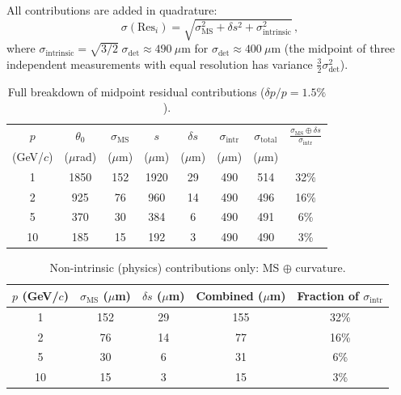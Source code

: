 \documentclass[11pt,a4paper]{article}
\begin{document}
All contributions are added in quadrature:
\begin{equation}
\sigma(\mathrm{Res}_i) = \sqrt{
\sigma_{\mathrm{MS}}^2 + \delta s^2 + \sigma_{\mathrm{intrinsic}}^2}\,,
\end{equation}
where $\sigma_{\mathrm{intrinsic}} = \sqrt{3/2}\;\sigma_{\mathrm{det}}
\approx 490~\mu$m for $\sigma_{\mathrm{det}} \approx 400~\mu$m
(the midpoint of three independent measurements with equal resolution
has variance $\tfrac{3}{2}\sigma_{\mathrm{det}}^2$).

\begin{table}[h]
\centering
\caption{Full breakdown of midpoint residual contributions
($\delta p/p = 1.5\%$).}
\label{tab:full}
\begin{tabular}{cccccccc}
\toprule
$p$ & $\theta_0$ & $\sigma_{\mathrm{MS}}$ & $s$ & $\delta s$ &
$\sigma_{\mathrm{intr}}$ & $\sigma_{\mathrm{total}}$ &
$\frac{\sigma_{\mathrm{MS}}\oplus\delta s}{\sigma_{\mathrm{intr}}}$ \\
(GeV/$c$) & ($\mu$rad) & ($\mu$m) & ($\mu$m) & ($\mu$m) &
($\mu$m) & ($\mu$m) & \\
\midrule
1  & 1850 & 152 & 1920 & 29 & 490 & 514 & 32\% \\
2  &  925 &  76 &  960 & 14 & 490 & 496 & 16\% \\
5  &  370 &  30 &  384 &  6 & 490 & 491 &  6\% \\
10 &  185 &  15 &  192 &  3 & 490 & 490 &  3\% \\
\bottomrule
\end{tabular}
\end{table}

\begin{table}[h]
\centering
\caption{Non-intrinsic (physics) contributions only: MS $\oplus$
curvature.}
\label{tab:physics}
\begin{tabular}{ccccc}
\toprule
$p$ (GeV/$c$) & $\sigma_{\mathrm{MS}}$ ($\mu$m)
& $\delta s$ ($\mu$m) & Combined ($\mu$m) &
Fraction of $\sigma_{\mathrm{intr}}$ \\
\midrule
1  & 152 & 29 & 155 & 32\% \\
2  &  76 & 14 &  77 & 16\% \\
5  &  30 &  6 &  31 &  6\% \\
10 &  15 &  3 &  15 &  3\% \\
\bottomrule
\end{tabular}
\end{table}

\end{document}
